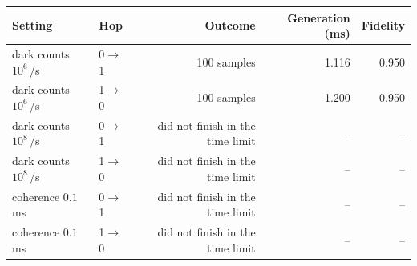 \begin{tabular}{llrrr}
\toprule
Setting & Hop & Outcome & Generation (ms) & Fidelity \\
\midrule
dark counts $10^6$\,/s & 0$\to$1 & 100 samples & 1.116 & 0.950 \\
dark counts $10^6$\,/s & 1$\to$0 & 100 samples & 1.200 & 0.950 \\
dark counts $10^8$\,/s & 0$\to$1 & did not finish in the time limit & -- & -- \\
dark counts $10^8$\,/s & 1$\to$0 & did not finish in the time limit & -- & -- \\
coherence $0.1$\,ms & 0$\to$1 & did not finish in the time limit & -- & -- \\
coherence $0.1$\,ms & 1$\to$0 & did not finish in the time limit & -- & -- \\
\bottomrule
\end{tabular}
